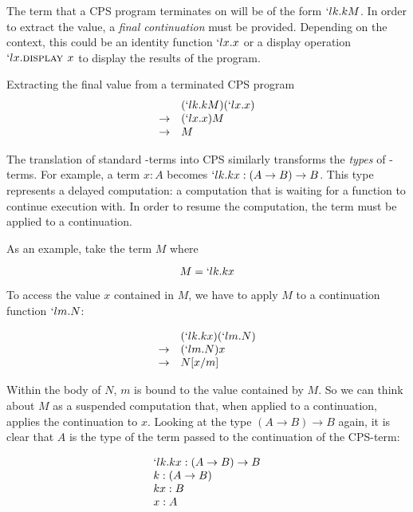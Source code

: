   The term that a CPS program terminates on will be of the form
  $`lk.kM$. In order to extract the value, a \emph{final continuation}
  must be provided. Depending on the context, this could be an identity 
  function $`lx.x$ or a display operation $`lx.\textsc{display }x$ to
  display the results of the program.

  \begin{example}{Extracting the final value from a terminated CPS program}
  \[
  \begin{array}{ll}
                & (`lk.kM)(`lx.x) \\
    \rightarrow & (`lx.x)M \\
    \rightarrow & M
  \end{array}
  \]
  \end{example}
 
  The translation of standard \lam-terms into CPS similarly transforms the 
  \emph{types} of \lam-terms. For example, a term $x : A$ becomes 
  $`lk.kx : (A \to B) \to B$. This type represents a delayed computation:
  a computation that is waiting for a function to continue execution with. 
  In order to resume the computation, the term must be applied to a 
  continuation.
  
  As an example, take the term $M$ where
  
  \[
    M = `lk.kx
  \]

  To access the value $x$ contained in $M$, we have to apply $M$ to a
  continuation function $`lm.N$:
  
  \[
  \begin{array}{rl}
      & (`lk.kx)(`lm.N) \\
      \to & (`lm.N)x \\
      \to & N[x/m]
  \end{array}
  \]
  
  Within the body of $N$, $m$ is bound to the value contained by $M$.
  So we can think about $M$ as a suspended computation that, when applied
  to a continuation, applies the continuation to $x$. Looking at
  the type $(A \to B) \to B$ again, it is clear that $A$ is the type
  of the term passed to the continuation of the CPS-term:
  
  \[
  \begin{array}{l}
    `lk.kx : (A \to B) \to B \\
    k : (A \to B) \\
    kx : B \\
    x : A \\
  \end{array} 
  \]
  
